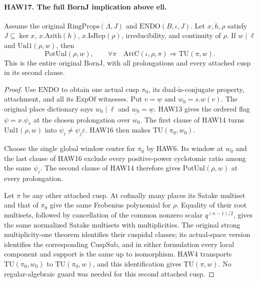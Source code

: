 \paragraph{HAW17. The full BornJ implication above ell.}
\label{claim:HAW17}
Assume the original $\mathrm{RingProps}(\Lambda,J)$ and
$\mathrm{ENDO}(B,\iota,J)$.  Let $x,h,\rho$ satisfy
$J\subseteq\ker x$, $x.\mathrm{Arith}(h)$,
$x.\mathrm{IsRep}(\rho)$, irreducibility, and continuity
of $\rho$.  If $w\mid\ell$ and
$\mathrm{Unl1}(\rho,w)$, then
\[
 \mathrm{PotUnl}(\rho,w),\qquad
 \forall\pi\quad\mathrm{AttC}(\iota,\rho,\pi)
                              \Longrightarrow\mathrm{TU}(\pi,w).
 \tag{HAW.28}
\]
This is the entire original $\mathrm{BornJ}$, with all
prolongations and every attached cusp in its second clause.
\begin{proof}
Use $\mathrm{ENDO}$ to obtain one actual cusp $\pi_0$,
its dual-is-conjugate property, attachment, and all its
$\mathrm{ExpOf}$ witnesses.  Put
$v=\underline w$ and $w_0=s.w(v)$.  The original place
dictionary says $w_0\mid\ell$ and
$\underline{w_0}=\underline w$.  HAW13 gives the ordered
flag $\psi=x.\psi_v$ at the chosen prolongation over $w_0$.
The first clause of HAW14 turns
$\mathrm{Unl1}(\rho,w)$ into
$\psi_i\ne\psi_j\varepsilon$.  HAW16 then makes
$\mathrm{TU}(\pi_0,w_0)$.

Choose the single global window center for $\pi_0$ by
HAW6.  Its window at $w_0$ and the last clause of HAW16
exclude every positive-power cyclotomic ratio among the
same $\psi_i$.  The second clause of HAW14 therefore gives
$\mathrm{PotUnl}(\rho,w)$ at every prolongation.

Let $\pi$ be any other attached cusp.  At cofinally many
places its Satake multiset and that of $\pi_0$ give the
same Frobenius polynomial for $\rho$.  Equality of their
root multisets, followed by cancellation of the common
nonzero scalar $q^{(n-1)/2}$, gives the same normalized
Satake multisets with multiplicities.  The original strong
multiplicity-one theorem identifies their cuspidal classes;
its actual-space version identifies the corresponding
$\mathrm{CuspSub}$, and in either formulation every local
component and support is the same up to isomorphism.
HAW4 transports $\mathrm{TU}(\pi_0,w_0)$ to
$\mathrm{TU}(\pi_0,w)$, and this identification gives
$\mathrm{TU}(\pi,w)$.  No regular-algebraic guard was
needed for this second attached cusp.
\end{proof}

